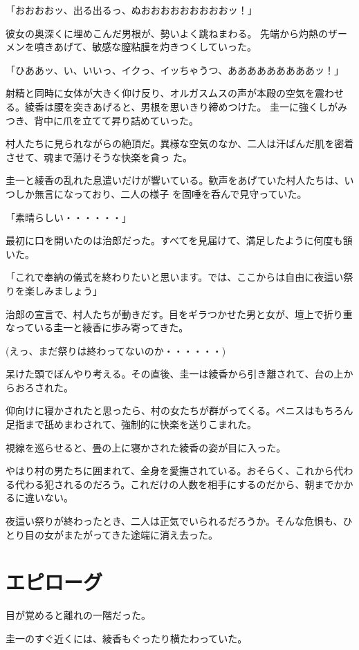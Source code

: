 ﻿\documentclass[book,tate]{jlreq}
\begin{document}
「おおおおッ、出る出るっ、ぬおおおおおおおおおッ！」

彼女の奥深くに埋めこんだ男根が、勢いよく跳ねまわる。 先端から灼熱のザーメンを噴きあげて、敏感な膣粘膜を灼きつくしていった。

「ひああッ、い、いいっ、イクっ、イッちゃうつ、あああああああああッ！」

射精と同時に女体が大きく仰け反り、オルガスムスの声が本殿の空気を震わせる。綾香は腰を突きあげると、男根を思いきり締めつけた。 圭一に強くしがみつき、背中に爪を立てて昇り詰めていった。

村人たちに見られながらの絶頂だ。異様な空気のなか、二人は汗ばんだ肌を密着させて、魂まで蕩けそうな快楽を貪っ た。

圭一と綾香の乱れた息遣いだけが響いている。歓声をあげていた村人たちは、いつしか無言になっており、二人の様子 を固唾を呑んで見守っていた。

「素晴らしい・・・・・・」

最初に口を開いたのは治郎だった。すべてを見届けて、満足したように何度も頷いた。

「これで奉納の儀式を終わりたいと思います。では、ここからは自由に夜這い祭りを楽しみましょう」

治郎の宣言で、村人たちが動きだす。目をギラつかせた男と女が、壇上で折り重なっている圭一と綾香に歩み寄ってきた。

(えっ、まだ祭りは終わってないのか・・・・・・)

呆けた頭でぼんやり考える。その直後、圭一は綾香から引き離されて、台の上からおろされた。

仰向けに寝かされたと思ったら、村の女たちが群がってくる。ペニスはもちろん足指まで舐めまわされて、強制的に快楽を送りこまれた。

視線を巡らせると、畳の上に寝かされた綾香の姿が目に入った。

やはり村の男たちに囲まれて、全身を愛撫されている。おそらく、これから代わる代わる犯されるのだろう。これだけの人数を相手にするのだから、朝までかかるに違いない。

夜這い祭りが終わったとき、二人は正気でいられるだろうか。そんな危惧も、ひとり目の女がまたがってきた途端に消え去った。

\chapter{エピローグ}

目が覚めると離れの一階だった。

圭一のすぐ近くには、綾香もぐったり横たわっていた。
\end{document}
